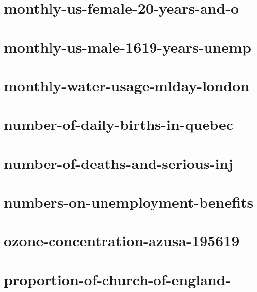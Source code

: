 \documentclass[twoside]{article}
\begin{document}
    

\section{monthly-us-female-20-years-and-o}

    

\section{monthly-us-male-1619-years-unemp}

    

\section{monthly-water-usage-mlday-london}

    

\section{number-of-daily-births-in-quebec}

    

\section{number-of-deaths-and-serious-inj}

    

\section{numbers-on-unemployment-benefits}

    

\section{ozone-concentration-azusa-195619}

    

\section{proportion-of-church-of-england-}
\end{document}
